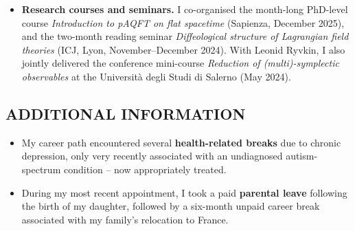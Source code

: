 \documentclass[a4paper,fontsize=11bp]{scrartcl}
\newenvironment{refsection}{\begingroup}{\endgroup}
\begin{document}
\begin{refsection}
\begin{itemize}
\item \textbf{Research courses and seminars.} I co-organised the month-long PhD-level course \emph{Introduction to pAQFT on flat spacetime} (Sapienza, December 2025), and the two-month reading seminar \emph{Diffeological structure of Lagrangian field theories} (ICJ, Lyon, November--December 2024). With Leonid Ryvkin, I also jointly delivered the conference mini-course \emph{Reduction of (multi)-symplectic observables} at the Universit\`a degli Studi di Salerno (May 2024).
\end{itemize}




\subsection*{ADDITIONAL INFORMATION}


\begin{itemize}
\setlength{\itemsep}{0.1\baselineskip}
\setlength{\parsep}{0pt}
\item
  My career path encountered several \textbf{health-related breaks} due to chronic depression, only very recently associated with an undiagnosed autism-spectrum condition -- now appropriately treated.
  \item
  During my most recent appointment, I took a paid \textbf{parental leave} following the birth of my daughter, followed by a six-month unpaid career break associated with my family's relocation to France.
\end{itemize}






\end{refsection}
\end{document}
